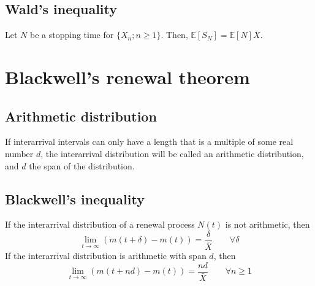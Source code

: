 \documentclass[12pt, openany]{report}
\newcommand{\E}{\mathbb{E}}
\theoremstyle{definition}
\begin{document}
\subsection{Wald's inequality}
Let $N$ be a stopping time for $\{X_n;n\ge 1\}$. Then, $\E[S_N]=\E[N]\bar X$.
\section{Blackwell's renewal theorem}
\subsection{Arithmetic distribution}
If interarrival intervals can only have a length that is a multiple of some real number $d$, the interarrival distribution will be called an arithmetic distribution, and $d$ the span of the distribution. 
\subsection{Blackwell's inequality}
If the interarrival distribution of a renewal process $N(t)$ is not arithmetic, then 
\begin{equation}
  \lim_{t\to\infty } \left(m(t+\delta)-m(t)\right) = \frac{\delta}{\bar X} \qquad \forall \delta 
\end{equation}
If the interarrival distribution is arithmetic with span $d$, then 
\begin{equation}
  \lim_{t\to\infty } \left(m(t+nd)-m(t)\right) = \frac{nd}{\bar X} \qquad \forall n\ge 1
\end{equation}
\end{document}
